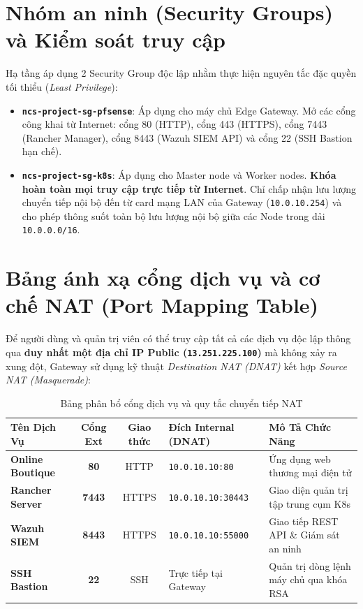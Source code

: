 \section{Nhóm an ninh (Security Groups) và Kiểm soát truy cập}
Hạ tầng áp dụng 2 Security Group độc lập nhằm thực hiện nguyên tắc đặc quyền tối thiểu (\textit{Least Privilege}):
\begin{itemize}
    \item \textbf{\texttt{ncs-project-sg-pfsense}}: Áp dụng cho máy chủ Edge Gateway. Mở các cổng công khai từ Internet: cổng 80 (HTTP), cổng 443 (HTTPS), cổng 7443 (Rancher Manager), cổng 8443 (Wazuh SIEM API) và cổng 22 (SSH Bastion hạn chế).
    \item \textbf{\texttt{ncs-project-sg-k8s}}: Áp dụng cho Master node và Worker nodes. \textbf{Khóa hoàn toàn mọi truy cập trực tiếp từ Internet}. Chỉ chấp nhận lưu lượng chuyển tiếp nội bộ đến từ card mạng LAN của Gateway (\texttt{10.0.10.254}) và cho phép thông suốt toàn bộ lưu lượng nội bộ giữa các Node trong dải \texttt{10.0.0.0/16}.
\end{itemize}

\section{Bảng ánh xạ cổng dịch vụ và cơ chế NAT (Port Mapping Table)}
Để người dùng và quản trị viên có thể truy cập tất cả các dịch vụ độc lập thông qua \textbf{duy nhất một địa chỉ IP Public (\texttt{13.251.225.100})} mà không xảy ra xung đột, Gateway sử dụng kỹ thuật \textit{Destination NAT (DNAT)} kết hợp \textit{Source NAT (Masquerade)}:

\begin{table}[H]
    \centering
    \small
    \renewcommand{\arraystretch}{1.25}
    \caption{Bảng phân bổ cổng dịch vụ và quy tắc chuyển tiếp NAT}
    \label{tab:port_mapping}
    \begin{tabularx}{\textwidth}{l c c l X}
        \toprule
        \textbf{Tên Dịch Vụ} & \textbf{Cổng Ext} & \textbf{Giao thức} & \textbf{Đích Internal (DNAT)} & \textbf{Mô Tả Chức Năng} \\
        \midrule
        \textbf{Online Boutique} & \textbf{80} & HTTP & \texttt{10.0.10.10:80} & Ứng dụng web thương mại điện tử \\
        \textbf{Rancher Server} & \textbf{7443} & HTTPS & \texttt{10.0.10.10:30443} & Giao diện quản trị tập trung cụm K8s \\
        \textbf{Wazuh SIEM} & \textbf{8443} & HTTPS & \texttt{10.0.10.10:55000} & Giao tiếp REST API \& Giám sát an ninh \\
        \textbf{SSH Bastion} & \textbf{22} & SSH & Trực tiếp tại Gateway & Quản trị dòng lệnh máy chủ qua khóa RSA \\
        \bottomrule
    \end{tabularx}
\end{table}

